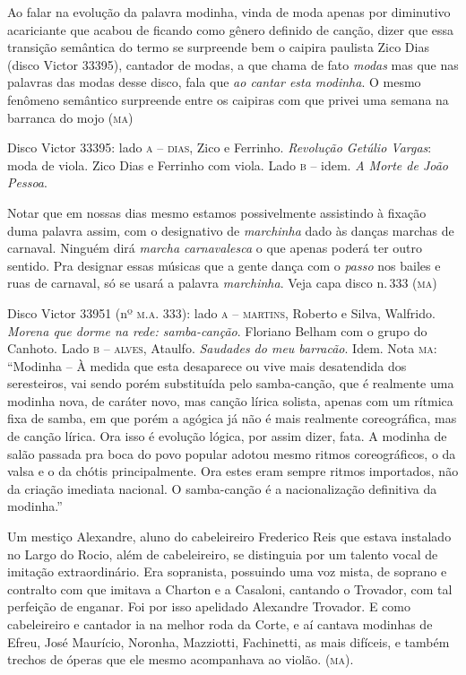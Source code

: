 Ao falar na evolução da palavra modinha, vinda de moda apenas por
diminutivo acariciante que acabou de ficando como gênero definido de
canção, dizer que essa transição semântica do termo se surpreende bem o
caipira paulista Zico Dias (disco Victor 33395), cantador de modas, a
que chama de fato \textit{modas} mas que nas palavras das modas desse disco,
fala que \textit{ao cantar esta modinha}. O mesmo fenômeno semântico surpreende
entre os caipiras com que privei uma semana na barranca do mojo (\textsc{ma})

Disco Victor 33395: lado \textsc{a} -- \textsc{dias}, Zico e Ferrinho. \textit{Revolução
Getúlio Vargas}: moda de viola. Zico Dias e Ferrinho com viola. Lado \textsc{b} --
idem. \emph{A Morte de João Pessoa}.

Notar que em nossas dias mesmo estamos possivelmente assistindo à
fixação duma palavra assim, com o designativo de \textit{marchinha} dado às
danças marchas de carnaval. Ninguém dirá \textit{marcha carnavalesca} o que
apenas poderá ter outro sentido. Pra designar essas músicas que a gente
dança com o \textit{passo} nos bailes e ruas de carnaval, só se usará a palavra
\textit{marchinha}. Veja capa disco n.\,333 (\textsc{ma})

Disco Victor 33951 (nº \textsc{m.a.} 333): lado \textsc{a} -- \textsc{martins}, Roberto e Silva,
Walfrido. \textit{Morena que dorme na rede: samba-canção}. Floriano Belham
com o grupo do Canhoto. Lado \textsc{b} -- \textsc{alves}, Ataulfo. \textit{Saudades do meu
barracão}. Idem. Nota \textsc{ma}: ``Modinha -- À medida que esta desaparece ou
vive mais desatendida dos seresteiros, vai sendo porém substituída pelo
samba-canção, que é realmente uma modinha nova, de caráter novo, mas
canção lírica solista, apenas com um rítmica fixa de samba, em que porém
a agógica já não é mais realmente coreográfica, mas de canção lírica.
Ora isso é evolução lógica, por assim dizer, fata. A modinha de salão
passada pra boca do povo popular adotou mesmo ritmos coreográficos, o da
valsa e o da chótis principalmente. Ora estes eram sempre ritmos
importados, não da criação imediata nacional. O samba-canção é a
nacionalização definitiva da modinha.''

Um mestiço Alexandre, aluno do cabeleireiro Frederico Reis que estava
instalado no Largo do Rocio, além de cabeleireiro, se distinguia por um
talento vocal de imitação extraordinário. Era sopranista, possuindo uma
voz mista, de soprano e contralto com que imitava a Charton e a
Casaloni, cantando o Trovador, com tal perfeição de enganar. Foi por
isso apelidado Alexandre Trovador. E como cabeleireiro e cantador ia na
melhor roda da Corte, e aí cantava modinhas de Efreu, José Maurício,
Noronha, Mazziotti, Fachinetti, as mais difíceis, e também trechos de
óperas que ele mesmo acompanhava ao violão. (\textsc{ma}).

